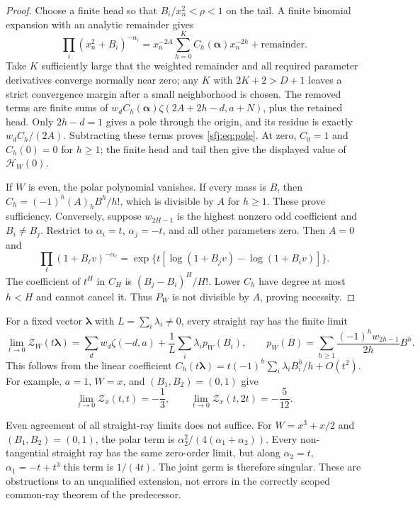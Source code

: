 \documentclass[11pt,letterpaper]{article}
\numberwithin{equation}{section}
\theoremstyle{definition}
\theoremstyle{remark}
\begin{document}
\begin{proof}
Choose a finite head so that $B_i/x_n^2<\rho<1$ on the tail.  A
finite binomial expansion with an analytic remainder gives
\[
 \prod_i(x_n^2+B_i)^{-\alpha_i}
     =x_n^{-2A}\sum_{h=0}^{K}C_h(\boldsymbol\alpha)x_n^{-2h}
                      +\text{remainder}.
\]
Take $K$ sufficiently large that the weighted remainder and all
required parameter derivatives converge normally near zero; any
$K$ with $2K+2>D+1$ leaves a strict convergence margin after a
small neighborhood is chosen.  The removed terms are finite sums of
$w_dC_h(\boldsymbol\alpha)\zeta(2A+2h-d,a+N)$, plus the retained
head.  Only $2h-d=1$ gives a pole through the origin, and its
residue is exactly $w_dC_h/(2A)$.  Subtracting these terms proves
\eqref{sfj:eq:pole}.  At zero, $C_0=1$ and $C_h(0)=0$ for $h\ge1$;
the finite head and tail then give the displayed value of
$\mathscr H_W(0)$.

If $W$ is even, the polar polynomial vanishes.  If every mass is
$B$, then $C_h=(-1)^h(A)_hB^h/h!$, which is divisible by $A$ for
$h\ge1$.  These prove sufficiency.  Conversely, suppose $w_{2H-1}$
is the highest nonzero odd coefficient and $B_i\ne B_j$.  Restrict
to $\alpha_i=t$, $\alpha_j=-t$, and all other parameters zero.
Then $A=0$ and
\[
 \prod_\ell(1+B_\ell v)^{-\alpha_\ell}
  =\exp\{t[\log(1+B_jv)-\log(1+B_iv)]\}.
\]
The coefficient of $t^H$ in $C_H$ is
$(B_j-B_i)^H/H!$.  Lower $C_h$ have degree at most $h<H$ and
cannot cancel it.  Thus $P_W$ is not divisible by $A$, proving
necessity.
\end{proof}

For a fixed vector $\boldsymbol\lambda$ with
$L=\sum_i\lambda_i\ne0$, every straight ray has the finite limit
\begin{equation}\label{sfj:eq:direction-limit}
 \lim_{t\to0}\mathscr Z_W(t\boldsymbol\lambda)
 =\sum_dw_d\zeta(-d,a)+\frac1L\sum_i\lambda_i p_W(B_i),\qquad
 p_W(B)=\sum_{h\ge1}\frac{(-1)^hw_{2h-1}}{2h}B^h.
\end{equation}
This follows from the linear coefficient
$C_h(t\boldsymbol\lambda)=
t(-1)^h\sum_i\lambda_iB_i^h/h+O(t^2)$.
For example, $a=1$, $W=x$, and $(B_1,B_2)=(0,1)$ give
\begin{equation}\label{sfj:eq:direction-counterexample}
 \lim_{t\to0}\mathscr Z_x(t,t)=-\frac13,
 \qquad
 \lim_{t\to0}\mathscr Z_x(t,2t)=-\frac5{12}.
\end{equation}

Even agreement of all straight-ray limits does not suffice.  For
$W=x^3+x/2$ and $(B_1,B_2)=(0,1)$, the polar term is
$\alpha_2^2/(4(\alpha_1+\alpha_2))$.  Every non-tangential straight
ray has the same zero-order limit, but along
$\alpha_2=t$, $\alpha_1=-t+t^3$ this term is $1/(4t)$.
The joint germ is therefore singular.  These are obstructions to an
unqualified extension, not errors in the correctly scoped common-ray
theorem of the predecessor.
\end{document}
